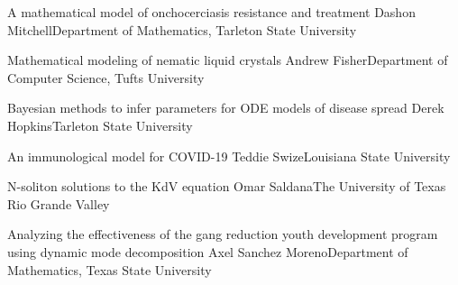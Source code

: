 \begin{postersPU}
\item\poster %
{A mathematical model of onchocerciasis resistance and treatment}
{Dashon Mitchell}{Department of Mathematics, Tarleton State University}

\item\poster %
{Mathematical modeling of nematic liquid crystals}
{Andrew Fisher}{Department of Computer Science, Tufts University}

\item\poster %
{Bayesian methods to infer parameters for ODE models of disease spread}
{Derek Hopkins}{Tarleton State University}

\item\poster %
{An immunological model for COVID-19}
{Teddie Swize}{Louisiana State University}
\item\poster %
{N-soliton solutions to the KdV equation}
{Omar Saldana}{The University of Texas Rio Grande Valley}

\item\poster %
{Analyzing the effectiveness of the gang reduction youth development program using dynamic mode decomposition}
{Axel Sanchez Moreno}{Department of Mathematics, Texas State University}

\end{postersPU}



